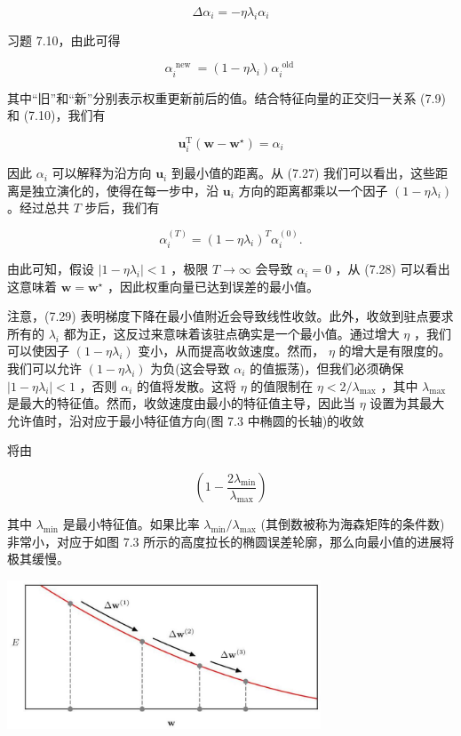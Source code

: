 \documentclass[10pt]{report}
\begin{document}
\[
\Delta {\alpha }_{i} =  - \eta {\lambda }_{i}{\alpha }_{i} \tag{7.26}
\]

习题 7.10，由此可得

\[
{\alpha }_{i}^{\text{ new }} = \left( {1 - \eta {\lambda }_{i}}\right) {\alpha }_{i}^{\text{ old }} \tag{7.27}
\]

其中“旧”和“新”分别表示权重更新前后的值。结合特征向量的正交归一关系 (7.9) 和 (7.10)，我们有

\[
{\mathbf{u}}_{i}^{\mathrm{T}}\left( {\mathbf{w} - {\mathbf{w}}^{ \star  }}\right)  = {\alpha }_{i} \tag{7.28}
\]

因此 \({\alpha }_{i}\) 可以解释为沿方向 \({\mathbf{u}}_{i}\) 到最小值的距离。从 (7.27) 我们可以看出，这些距离是独立演化的，使得在每一步中，沿 \({\mathbf{u}}_{i}\) 方向的距离都乘以一个因子 \(\left( {1 - \eta {\lambda }_{i}}\right)\) 。经过总共 \(T\) 步后，我们有

\[
{\alpha }_{i}^{\left( T\right) } = {\left( 1 - \eta {\lambda }_{i}\right) }^{T}{\alpha }_{i}^{\left( 0\right) }. \tag{7.29}
\]

由此可知，假设 \(\left| {1 - \eta {\lambda }_{i}}\right|  < 1\) ，极限 \(T \rightarrow  \infty\) 会导致 \({\alpha }_{i} = 0\) ，从 (7.28) 可以看出这意味着 \(\mathbf{w} = {\mathbf{w}}^{ \star  }\) ，因此权重向量已达到误差的最小值。

注意，(7.29) 表明梯度下降在最小值附近会导致线性收敛。此外，收敛到驻点要求所有的 \({\lambda }_{i}\) 都为正，这反过来意味着该驻点确实是一个最小值。通过增大 \(\eta\) ，我们可以使因子 \(\left( {1 - \eta {\lambda }_{i}}\right)\) 变小，从而提高收敛速度。然而， \(\eta\) 的增大是有限度的。我们可以允许 \(\left( {1 - \eta {\lambda }_{i}}\right)\) 为负(这会导致 \({\alpha }_{i}\) 的值振荡)，但我们必须确保 \(\left| {1 - \eta {\lambda }_{i}}\right|  < 1\) ，否则 \({\alpha }_{i}\) 的值将发散。这将 \(\eta\) 的值限制在 \(\eta  < 2/{\lambda }_{\max }\) ，其中 \({\lambda }_{\max }\) 是最大的特征值。然而，收敛速度由最小的特征值主导，因此当 \(\eta\) 设置为其最大允许值时，沿对应于最小特征值方向(图 7.3 中椭圆的长轴)的收敛

将由

\[
\left( {1 - \frac{2{\lambda }_{\min }}{{\lambda }_{\max }}}\right)  \tag{7.30}
\]

其中 \({\lambda }_{\min }\) 是最小特征值。如果比率 \({\lambda }_{\min }/{\lambda }_{\max }\) (其倒数被称为海森矩阵的条件数)非常小，对应于如图 7.3 所示的高度拉长的椭圆误差轮廓，那么向最小值的进展将极其缓慢。

\begin{center}
\includegraphics[max width=0.7\textwidth]{images/0194e279-9b28-703a-88f4-c3ac21e2010d_239_542_345_930_442_0.jpg}
\end{center}
\hspace*{3em} 
\end{document}
